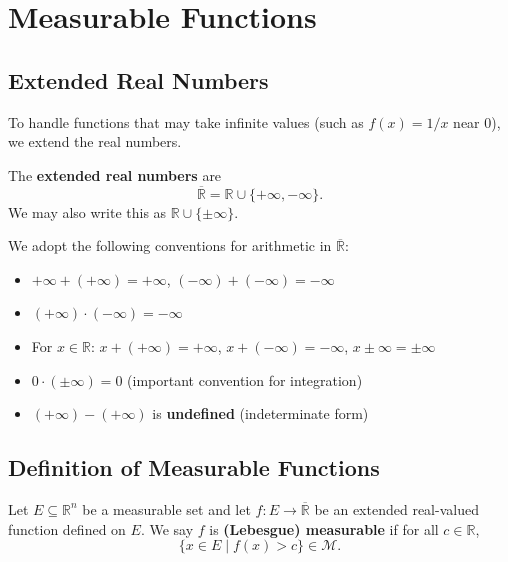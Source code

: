 \documentclass[11pt]{report}
\begin{document}
\section{Measurable Functions}

\subsection{Extended Real Numbers}

To handle functions that may take infinite values (such as $f(x) = 1/x$ near $0$), we extend the real numbers.

\begin{defbox}
The \textbf{extended real numbers} are
\[
\overline{\mathbb{R}} = \mathbb{R} \cup \{+\infty, -\infty\}.
\]
We may also write this as $\mathbb{R} \cup \{\pm\infty\}$.
\end{defbox}

\begin{notebox}
We adopt the following conventions for arithmetic in $\overline{\mathbb{R}}$:
\begin{itemize}
    \item $+\infty + (+\infty) = +\infty$, \quad $(-\infty) + (-\infty) = -\infty$
    \item $(+\infty) \cdot (-\infty) = -\infty$
    \item For $x \in \mathbb{R}$: $x + (+\infty) = +\infty$, \quad $x + (-\infty) = -\infty$, \quad $x \pm \infty = \pm\infty$
    \item $0 \cdot (\pm\infty) = 0$ (important convention for integration)
    \item $(+\infty) - (+\infty)$ is \textbf{undefined} (indeterminate form)
\end{itemize}
\end{notebox}

\subsection{Definition of Measurable Functions}

\begin{defbox}
Let $E \subseteq \mathbb{R}^n$ be a measurable set and let $f: E \to \overline{\mathbb{R}}$ be an extended real-valued function defined on $E$. We say $f$ is \textbf{(Lebesgue) measurable} if for all $c \in \mathbb{R}$,
\[
\{x \in E \mid f(x) > c\} \in \mathcal{M}.
\]
\end{defbox}
\end{document}
